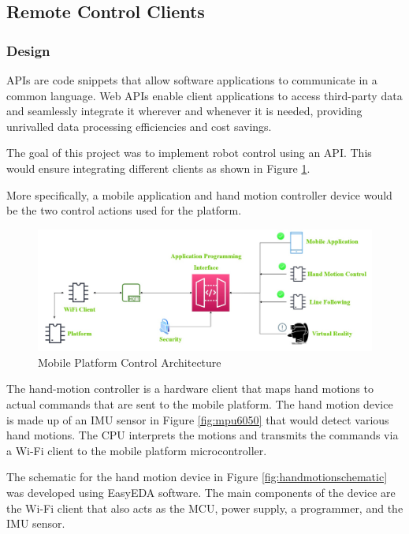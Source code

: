 \subsection{Remote Control Clients}
\label{sec:remoteClients}

\subsubsection{Design}

\ac{API}s are code snippets that allow software applications to communicate in a common language. Web \ac{API}s enable client applications to access third-party data and seamlessly integrate it wherever and whenever it is needed, providing unrivalled data processing efficiencies and cost savings. 
\par
The goal of this project was to implement robot control using an \ac{API}. This would ensure integrating different clients as shown in Figure \ref{fig:omicronplatformcontrol}. 

More specifically, a mobile application and hand motion controller device would be the two control actions used for the platform.

\begin{figure}[H]
    \centering
    \includegraphics[scale=0.3]{Figures/omriconrobotPlatformControl.jpg}
    \caption{Mobile Platform Control Architecture}
    \label{fig:omicronplatformcontrol}
\end{figure}

\vspace{15mm}

The hand-motion controller is a hardware client that maps hand motions to actual commands that are sent to the mobile platform. The hand motion device is made up of an \ac{IMU} sensor in Figure \ref{fig:mpu6050} that would detect various hand motions. The \ac{CPU} interprets the motions and transmits the commands via a Wi-Fi client to the mobile platform microcontroller.

The schematic for the hand motion device in Figure \ref{fig:handmotionschematic} was developed using EasyEDA software. The main components of the device are the Wi-Fi client that also acts as the \ac{MCU}, power supply, a programmer, and the \ac{IMU} sensor.

